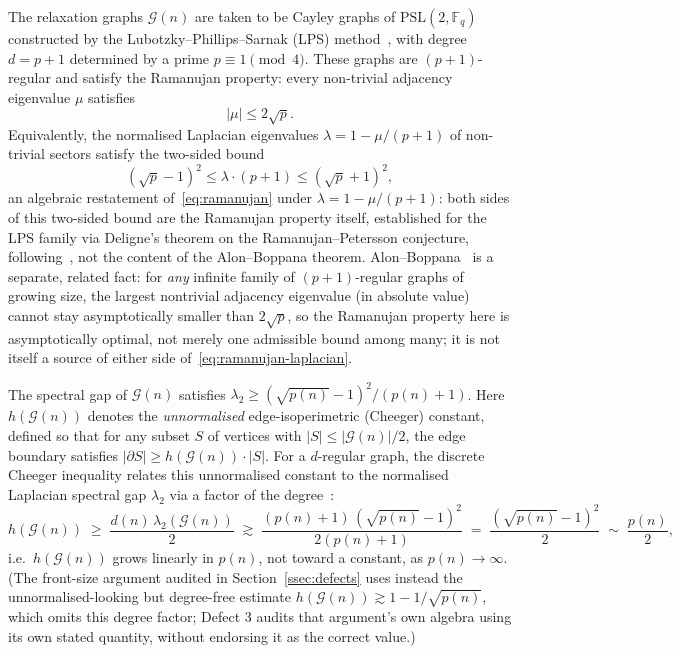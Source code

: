 \documentclass[11pt,a4paper]{article}
\theoremstyle{definition}
\theoremstyle{remark}
\begin{document}
    The relaxation graphs $\mathcal{G}(n)$ are taken to be Cayley graphs of
    $\mathrm{PSL}(2, \mathbb{F}_q)$ constructed by the Lubotzky--Phillips--Sarnak (LPS)
    method~\cite{LPS}, with degree $d = p + 1$ determined by a prime $p \equiv 1 \pmod{4}$.
    These graphs are $(p+1)$-regular and satisfy the Ramanujan property: every non-trivial
    adjacency eigenvalue $\mu$ satisfies
    \begin{equation}
      \label{eq:ramanujan}
      |\mu| \leq 2\sqrt{p}.
    \end{equation}
    Equivalently, the normalised Laplacian eigenvalues $\lambda = 1 - \mu/(p+1)$ of
    non-trivial sectors satisfy the two-sided bound
    \begin{equation}
      \label{eq:ramanujan-laplacian}
      \left(\sqrt{p} - 1\right)^2 \leq \lambda \cdot (p+1) \leq \left(\sqrt{p} + 1\right)^2,
    \end{equation}
    an algebraic restatement of~\eqref{eq:ramanujan} under $\lambda=1-\mu/(p+1)$: both sides
    of this two-sided bound are the Ramanujan property itself, established for the LPS
    family via Deligne's theorem on the Ramanujan--Petersson conjecture, following~\cite{LPS},
    not the content of the Alon--Boppana theorem.
    Alon--Boppana~\cite{AlonBoppana} is a separate, related fact: for \emph{any} infinite
    family of $(p+1)$-regular graphs of growing size, the largest nontrivial adjacency
    eigenvalue (in absolute value) cannot stay asymptotically smaller than $2\sqrt p$, so the
    Ramanujan property here is asymptotically optimal, not merely one admissible bound among
    many; it is not itself a source of either side of~\eqref{eq:ramanujan-laplacian}.

    The spectral gap of $\mathcal{G}(n)$ satisfies
    $\lambda_2 \geq (\sqrt{p(n)} - 1)^2 / (p(n) + 1)$.
    Here $h(\mathcal{G}(n))$ denotes the \emph{unnormalised} edge-isoperimetric (Cheeger)
    constant, defined so that for any subset $S$ of vertices with $|S| \leq |\mathcal{G}(n)|/2$,
    the edge boundary satisfies $|\partial S| \geq h(\mathcal{G}(n)) \cdot |S|$.
    For a $d$-regular graph, the discrete Cheeger inequality relates this unnormalised
    constant to the normalised Laplacian spectral gap $\lambda_2$ via a factor of the
    degree~\cite{Cheeger, HLW}:
    \begin{equation}
      \label{eq:cheeger-background}
      h(\mathcal{G}(n))
      \;\geq\;
      \frac{d(n)\,\lambda_2(\mathcal{G}(n))}{2}
      \;\gtrsim\;
      \frac{(p(n)+1)\,(\sqrt{p(n)} - 1)^2}{2(p(n) + 1)}
      \;=\;
      \frac{(\sqrt{p(n)}-1)^2}{2}
      \;\sim\;
      \frac{p(n)}{2},
    \end{equation}
    i.e.\ $h(\mathcal{G}(n))$ grows linearly in $p(n)$, not toward a constant, as
    $p(n) \to \infty$.
    (The front-size argument audited in Section~\ref{ssec:defects} uses instead the
    unnormalised-looking but degree-free estimate $h(\mathcal{G}(n)) \gtrsim
    1 - 1/\sqrt{p(n)}$, which omits this degree factor; Defect 3 audits that argument's own
    algebra using its own stated quantity, without endorsing it as the correct value.)
\end{document}
